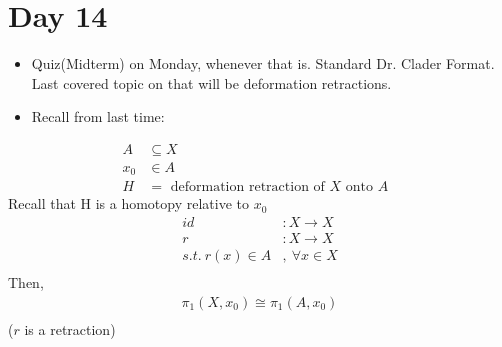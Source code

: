 \documentclass[../notes.tex]{subfiles}
\begin{document}
\section{Day 14}
    \begin{itemize}
        \item Quiz(Midterm) on Monday, whenever that is. Standard Dr. Clader Format. Last
            covered topic on that will be deformation retractions.
        \item Recall from last time:
    \end{itemize}
    \begin{theorem}
        \begin{align*}
            A&\subseteq X\\
            x_0& \in A\\
            H&=\text{ deformation retraction of $X$ onto $A$ }
        \end{align*}
        Recall that H is a homotopy relative to $x_0$
        \begin{align*}
            id&: X\rightarrow X\\
            r&: X \rightarrow X\\
            s.t.\ r(x)\in A&,\ \forall x\in X\\
        \end{align*}
        Then,
        \begin{align*}
            \pi_1(X,x_0)\cong\pi_1(A,x_0)\\
        \end{align*}
        ($r$ is a retraction)
    \end{theorem}
\end{document}
